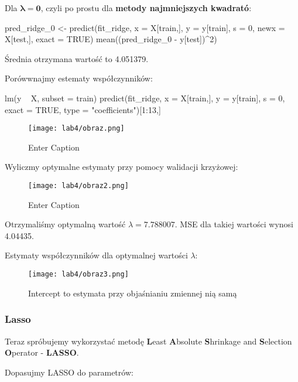 Dla \(\boldsymbol{\lambda = 0}\), czyli po prostu dla \textbf{metody najmniejszych kwadrató}:
\begin{Rcode}
pred_ridge_0 <- predict(fit_ridge, x = X[train,], y = y[train], s = 0, 
                      newx = X[test,], exact = TRUE)
mean((pred_ridge_0 - y[test])^2)
\end{Rcode}
Średnia otrzymana wartość to 4.051379.

Porówwnajmy estematy współczynników:
\begin{Rcode}
lm(y ~ X, subset = train)
predict(fit_ridge, x = X[train,], y = y[train], s = 0, exact = TRUE, 
        type = "coefficients")[1:13,]
\end{Rcode}

\begin{figure}[H]
    \centering
    \texttt{[image: lab4/obraz.png]}
    \caption{Enter Caption}
    \label{fig:enter-label}
\end{figure}

Wyliczmy optymalne estymaty przy pomocy walidacji krzyżowej:


\begin{figure}[H]
    \centering
    \texttt{[image: lab4/obraz2.png]}
    \caption{Enter Caption}
    \label{fig:enter-label}
\end{figure}

Otrzymaliśmy optymalną wartość $\lambda = 7.788007$. MSE dla takiej wartości wynosi 4.04435.

Estymaty współczynników dla optymalnej wartości $\lambda$:

\begin{figure}[H]
    \centering
    \texttt{[image: lab4/obraz3.png]}
    \caption{Intercept to estymata przy objaśnianiu zmiennej nią samą}
    \label{fig:enter-label}
\end{figure}

\subsubsection{Lasso}
Teraz spróbujemy wykorzystać metodę \textbf{L}east \textbf{A}bsolute \textbf{S}hrinkage and \textbf{S}election \textbf{O}perator - \textbf{LASSO}.

Dopasujmy LASSO do parametrów:

